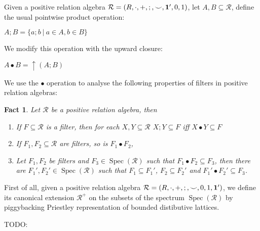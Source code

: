 \documentclass[a4paper]{article}
\theoremstyle{defin}
\theoremstyle{theorem}
\theoremstyle{claim}
\theoremstyle{prop}
\theoremstyle{lemma}
\theoremstyle{fact}
\newtheorem{fact}{Fact}
\theoremstyle{ex}
\theoremstyle{col}
\begin{document}
Given a positive relation algebra $\mathcal{R} = (R, \cdot, +, ;, \smile, {\bf 1}', 0, 1)$, let $A, B \subseteq \mathcal{R}$, define the usual pointwise product operation:
\begin{center}
$A ; B = \{ a ; b \: | \: a \in A, b \in B \}$
\end{center}
We modify this operation with the upward closure:
\begin{center}
$A \bullet B = \uparrow (A ; B)$
\end{center}

We use the $\bullet$ operation to analyse the following properties of filters in positive relation algebras:
\begin{fact} Let $\mathcal{R}$ be a positive relation algebra, then

\begin{enumerate}
\item If $F \subseteq \mathcal{R}$ is a filter, then for each $X, Y \subseteq \mathcal{R}$ $X ; Y \subseteq F$ iff $X \bullet Y \subseteq F$
\item If $F_1, F_2 \subseteq \mathcal{R}$ are filters, so is $F_1 \bullet F_2$,
\item Let $F_1, F_2$ be filters and $F_3 \in \operatorname{Spec}(\mathcal{R})$ such that $F_1 \bullet F_2 \subseteq F_3$, then there are $F_1', F_2' \in \operatorname{Spec}(\mathcal{R})$ such that $F_1 \subseteq F_1'$, $F_2 \subseteq F_2'$ and $F_1' \bullet F_2' \subseteq F_3$.
\end{enumerate}
\end{fact}

First of all, given a positive relation algebra $\mathcal{R} = (R, \cdot, +, ;, \smile, 0, 1, {\bf 1}')$, we define its canonical extension $\mathcal{R}^{+}$ on the subsets of the spectrum $\operatorname{Spec}(\mathcal{R})$ by piggybacking Priestley representation of bounded distibutive lattices.

TODO:
\end{document}
